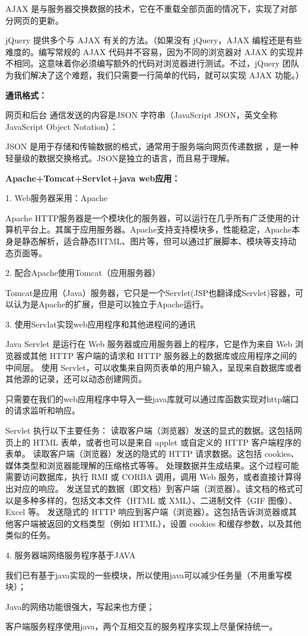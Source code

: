 AJAX 是与服务器交换数据的技术，它在不重载全部页面的情况下，实现了对部分网页的更新。

jQuery 提供多个与 AJAX 有关的方法。（如果没有 jQuery，AJAX 编程还是有些难度的。编写常规的 AJAX 代码并不容易，因为不同的浏览器对 AJAX 的实现并不相同。这意味着你必须编写额外的代码对浏览器进行测试。不过，jQuery 团队为我们解决了这个难题，我们只需要一行简单的代码，就可以实现 AJAX 功能。）

\textbf{通讯格式：}

网页和后台 通信发送的内容是JSON 字符串（JavaScript JSON，英文全称 JavaScript Object Notation）：

JSON 是用于存储和传输数据的格式，通常用于服务端向网页传递数据 ，是一种轻量级的数据交换格式。JSON是独立的语言，而且易于理解。

\textbf{Apache+Tomcat+Servlet+java web应用：}

1.  Web服务器采用：Apache

Apache HTTP服务器是一个模块化的服务器，可以运行在几乎所有广泛使用的计算机平台上。其属于应用服务器。Apache支持支持模块多，性能稳定，Apache本身是静态解析，适合静态HTML、图片等，但可以通过扩展脚本、模块等支持动态页面等。 

2.  配合Apache使用Tomcat（应用服务器）

Tomcat是应用（Java）服务器，它只是一个Servlet(JSP也翻译成Servlet)容器，可以认为是Apache的扩展，但是可以独立于Apache运行。

3.  使用Servlat实现web应用程序和其他进程间的通讯

Java Servlet 是运行在 Web 服务器或应用服务器上的程序，它是作为来自 Web 浏览器或其他 HTTP 客户端的请求和 HTTP 服务器上的数据库或应用程序之间的中间层。
使用 Servlet，可以收集来自网页表单的用户输入，呈现来自数据库或者其他源的记录，还可以动态创建网页。

只需要在我们的web应用程序中导入一些java库就可以通过库函数实现对http端口的请求监听和响应。

Servlet 执行以下主要任务：
读取客户端（浏览器）发送的显式的数据。这包括网页上的 HTML 表单，或者也可以是来自 applet 或自定义的 HTTP 客户端程序的表单。
读取客户端（浏览器）发送的隐式的 HTTP 请求数据。这包括 cookies、媒体类型和浏览器能理解的压缩格式等等。
处理数据并生成结果。这个过程可能需要访问数据库，执行 RMI 或 CORBA 调用，调用 Web 服务，或者直接计算得出对应的响应。
发送显式的数据（即文档）到客户端（浏览器）。该文档的格式可以是多种多样的，包括文本文件（HTML 或 XML）、二进制文件（GIF 图像）、Excel 等。
发送隐式的 HTTP 响应到客户端（浏览器）。这包括告诉浏览器或其他客户端被返回的文档类型（例如 HTML），设置 cookies 和缓存参数，以及其他类似的任务。

4.  服务器端网络服务程序基于JAVA

我们已有基于java实现的一些模块，所以使用java可以减少任务量（不用重写模块）；

Java的网络功能很强大，写起来也方便；

客户端服务程序使用java，两个互相交互的服务程序实现上尽量保持统一。




